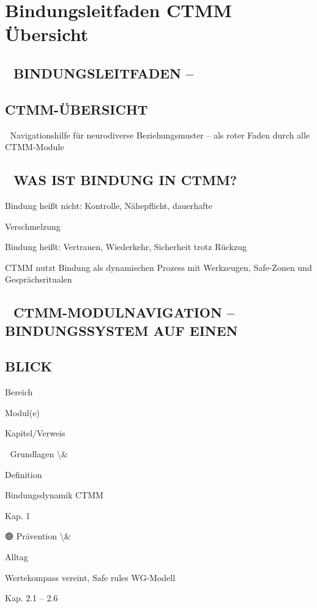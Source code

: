 \section{Bindungsleitfaden CTMM Übersicht }

\subsection{🏥 BINDUNGSLEITFADEN --}

\subsection{CTMM-ÜBERSICHT}

🧩 Navigationshilfe für neurodiverse Beziehungsmuster -- als roter Faden durch alle CTMM-Module

\subsection{📘 WAS IST BINDUNG IN CTMM?}

Bindung heißt nicht: Kontrolle, Nähepflicht, dauerhafte

Verschmelzung

Bindung heißt: Vertrauen, Wiederkehr, Sicherheit trotz Rückzug

CTMM nutzt Bindung als dynamischen Prozess mit Werkzeugen, Safe-Zonen und Gesprächsritualen

\subsection{🧭 CTMM-MODULNAVIGATION -- BINDUNGSSYSTEM AUF EINEN}

\subsection{BLICK}

Bereich

Modul(e)

Kapitel/Verweis

🔵 Grundlagen \textbackslash{}&

Definition

Bindungsdynamik CTMM

Kap. 1

🟢 Prävention \textbackslash{}&

Alltag

Wertekompass vereint, Safe rules WG-Modell

Kap. 2.1 -- 2.6

